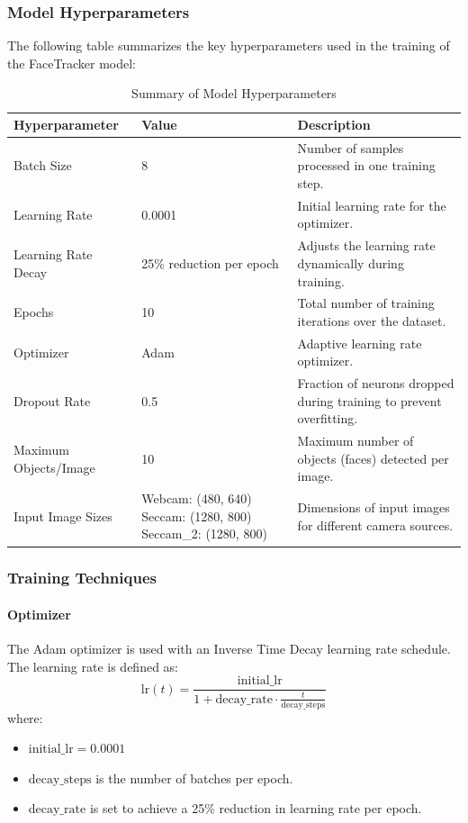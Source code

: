 \subsubsection{Model Hyperparameters}

The following table summarizes the key hyperparameters used in the training of the FaceTracker model:

\begin{table}[ht!]
    \centering
    \caption{Summary of Model Hyperparameters}
    \label{tab:model-hyperparameters}
    \begin{tabular}{|p{4cm}|p{5cm}|p{5cm}|}
        \hline
        \textbf{Hyperparameter} & \textbf{Value} & \textbf{Description} \\
        \hline
        Batch Size & 8 & Number of samples processed in one training step. \\
        \hline
        Learning Rate & 0.0001 & Initial learning rate for the optimizer. \\
        \hline
        Learning Rate Decay & 25\% reduction per epoch & Adjusts the learning rate dynamically during training. \\
        \hline
        Epochs & 10 & Total number of training iterations over the dataset. \\
        \hline
        Optimizer & Adam & Adaptive learning rate optimizer. \\
        \hline
        Dropout Rate & 0.5 & Fraction of neurons dropped during training to prevent overfitting. \\
        \hline
        Maximum Objects/Image & 10 & Maximum number of objects (faces) detected per image. \\
        \hline
        Input Image Sizes & Webcam: (480, 640) \newline Seccam: (1280, 800) \newline Seccam\_2: (1280, 800) & Dimensions of input images for different camera sources. \\
        \hline
    \end{tabular}
\end{table}

\subsubsection{Training Techniques}

\paragraph{Optimizer}
The Adam optimizer is used with an Inverse Time Decay learning rate schedule. The learning rate is defined as:
\[
\text{lr}(t) = \frac{\text{initial\_lr}}{1 + \text{decay\_rate} \cdot \frac{t}{\text{decay\_steps}}}
\]
where:
\begin{itemize}
    \item \(\text{initial\_lr} = 0.0001\)
    \item \(\text{decay\_steps}\) is the number of batches per epoch.
    \item \(\text{decay\_rate}\) is set to achieve a 25\% reduction in learning rate per epoch.
\end{itemize}


